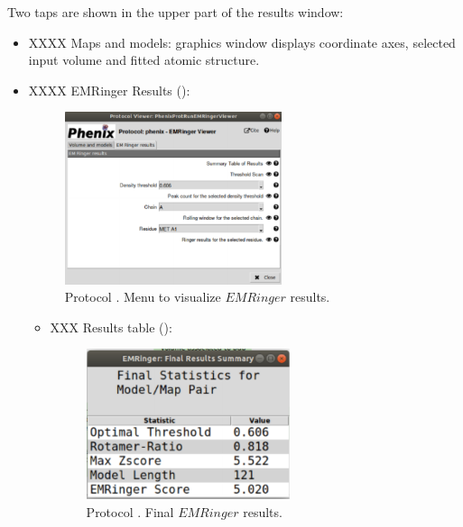 \begin{itemize}
   Two taps are shown in the upper part of the results window:
    \begin{itemize}
     \item XXXX Maps and models:
     \chimera graphics window displays coordinate axes, selected input volume and fitted atomic structure.
     \item XXXX EMRinger Results ():
     
     \begin{figure}[H]
     \centering 
     \captionsetup{width=.7\linewidth} 
     \includegraphics[width=0.60\textwidth]{Images_appendix/Fig141.pdf}
     \caption{Protocol . Menu to visualize $EMRinger$ results.}
     \label{fig:app_protocol_emringer_3}
    \end{figure}
      \begin{itemize}
        \item XXX Results table ():
        \begin{figure}[H]
         \centering 
         \captionsetup{width=.7\linewidth} 
         \includegraphics[width=0.60\textwidth]{Images_appendix/Fig142.pdf}
         \caption{Protocol . Final $EMRinger$ results.}
        \label{fig:app_protocol_emringer_4}
     \end{figure}

\end{itemize}
\end{itemize}
\end{itemize}
